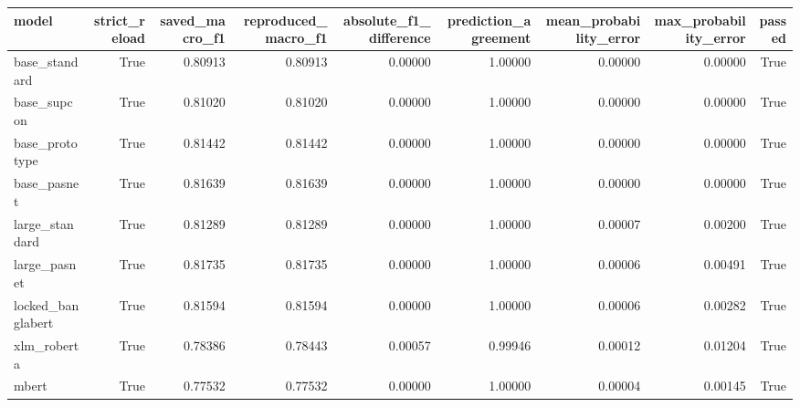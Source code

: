\begin{tabular}{lrrrrrrrr}
\toprule
model & strict\_reload & saved\_macro\_f1 & reproduced\_macro\_f1 & absolute\_f1\_difference & prediction\_agreement & mean\_probability\_error & max\_probability\_error & passed \\
\midrule
base\_standard & True & 0.80913 & 0.80913 & 0.00000 & 1.00000 & 0.00000 & 0.00000 & True \\
base\_supcon & True & 0.81020 & 0.81020 & 0.00000 & 1.00000 & 0.00000 & 0.00000 & True \\
base\_prototype & True & 0.81442 & 0.81442 & 0.00000 & 1.00000 & 0.00000 & 0.00000 & True \\
base\_pasnet & True & 0.81639 & 0.81639 & 0.00000 & 1.00000 & 0.00000 & 0.00000 & True \\
large\_standard & True & 0.81289 & 0.81289 & 0.00000 & 1.00000 & 0.00007 & 0.00200 & True \\
large\_pasnet & True & 0.81735 & 0.81735 & 0.00000 & 1.00000 & 0.00006 & 0.00491 & True \\
locked\_banglabert & True & 0.81594 & 0.81594 & 0.00000 & 1.00000 & 0.00006 & 0.00282 & True \\
xlm\_roberta & True & 0.78386 & 0.78443 & 0.00057 & 0.99946 & 0.00012 & 0.01204 & True \\
mbert & True & 0.77532 & 0.77532 & 0.00000 & 1.00000 & 0.00004 & 0.00145 & True \\
\bottomrule
\end{tabular}

